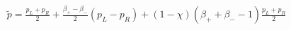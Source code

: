 \documentclass[10pt]{article}
\begin{document}
\begin{align*}{\widetilde p} 
=
\frac{p_{L}+p_{R}}{2}
+\frac{\beta_{+}-\beta_{-}}{2} \left( p_{L} - p_{R} \right)
+\left( 1- \chi \right) \left( \beta_{+} + \beta_{-} - 1 \right) \frac{p_{L}+p_{R}}{2}\end{align*}
\end{document}
